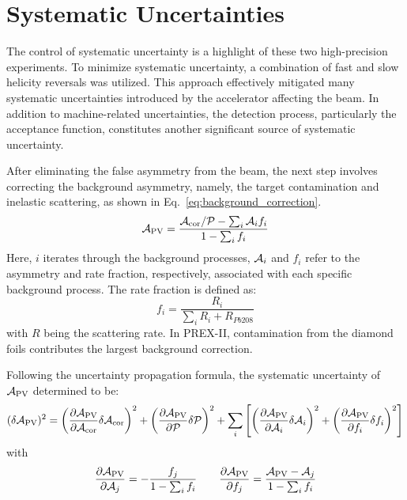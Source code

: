 \chapter{Systematic Uncertainties}
\label{cha:systematic_uncertainties}

The control of systematic uncertainty is a highlight of these two
high-precision experiments. To minimize systematic uncertainty, a
combination of fast and slow helicity reversals was utilized. This approach effectively mitigated many systematic uncertainties introduced by the accelerator affecting the beam. In addition to machine-related uncertainties, the detection process, particularly the acceptance function, constitutes another significant source of systematic uncertainty.

After eliminating the false asymmetry from the beam, the next step involves correcting the
background asymmetry, namely, the target contamination and inelastic scattering,
as shown in Eq.~\ref{eq:background_correction}.
\begin{equation}
    \mathcal{A}_{\text{PV}} = \frac{\mathcal{A}_{\text{cor}}/\mathcal{P} - \sum_i \mathcal{A}_i f_i}{1 - \sum_i f_i}
    \label{eq:background_correction}
\end{equation}
Here, $i$ iterates through the background processes, $\mathcal{A}_i$ and $f_i$ refer to 
the asymmetry and rate fraction, respectively, associated with each specific 
background process. The rate fraction is defined as:
\begin{equation}
    f_i = \frac{R_i}{\sum_i R_i + R_{Pb208}}
\end{equation}
with $R$ being the scattering rate.
In PREX-II, contamination from the diamond foils contributes the largest 
background correction.

Following the uncertainty propagation formula, the systematic uncertainty of
$\mathcal{A}_{\text{PV}}$ determined to be:
\begin{equation}
    (\delta \mathcal{A}_{\text{PV}})^2 = 
      \left( \frac{\partial \mathcal{A}_{\text{PV}}}{\partial \mathcal{A}_{\text{cor}}} \delta \mathcal{A}_{\text{cor}} \right)^2
      + \left( \frac{\partial \mathcal{A}_{\text{PV}}}{\partial \mathcal{P}} \delta \mathcal{P} \right)^2
      + \sum_i \left[ \left(\frac{\partial \mathcal{A}_{\text{PV}}}{\partial \mathcal{A}_i}\delta \mathcal{A}_i \right)^2 
	 + \left(\frac{\partial \mathcal{A}_{\text{PV}}}{\partial f_i}\delta f_i \right)^2 \right]
\end{equation}
with
\begin{equation}
    \frac{\partial \mathcal{A}_{\text{PV}}}{\partial \mathcal{A}_j} = -\frac{f_j}{1 - \sum_i f_i}  \qquad
    \frac{\partial \mathcal{A}_{\text{PV}}}{\partial f_j} = \frac{\mathcal{A}_{\text{PV}} - \mathcal{A}_j}{1 - \sum_i f_i}
    \label{eq:systematic_uncertainty}
\end{equation}

